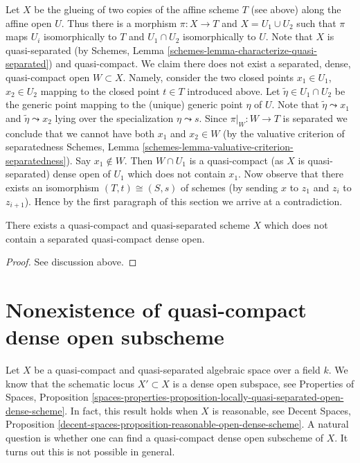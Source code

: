 \noindent
Let $X$ be the glueing of two copies of the affine scheme $T$ (see above)
along the affine open $U$. Thus there is a morphism $\pi : X \to T$ and
$X = U_1 \cup U_2$ such that $\pi$ maps $U_i$ isomorphically to $T$ and
$U_1 \cap U_2$ isomorphically to $U$. Note that $X$ is quasi-separated
(by Schemes, Lemma \ref{schemes-lemma-characterize-quasi-separated})
and quasi-compact. We claim there does not exist a separated, dense,
quasi-compact open $W \subset X$. Namely, consider the two closed
points $x_1 \in U_1$, $x_2 \in U_2$ mapping to the closed point $t \in T$
introduced above. Let $\tilde \eta \in U_1 \cap U_2$ be the generic point
mapping to the (unique) generic point $\eta$ of $U$.
Note that $\tilde\eta \leadsto x_1$ and $\tilde\eta \leadsto x_2$
lying over the specialization $\eta \leadsto s$.
Since $\pi|_W : W \to T$ is separated we conclude that we cannot have both
$x_1$ and $x_2 \in W$ (by the valuative criterion of separatedness
Schemes, Lemma \ref{schemes-lemma-valuative-criterion-separatedness}).
Say $x_1 \not \in W$. Then $W \cap U_1$ is a quasi-compact (as $X$
is quasi-separated) dense open of $U_1$ which does not contain $x_1$.
Now observe that there exists an isomorphism $(T, t) \cong (S, s)$
of schemes (by sending $x$ to $z_1$ and $z_i$ to $z_{i + 1}$).
Hence by the first paragraph of this section we arrive at a contradiction.

\begin{lemma}
\label{lemma-no-dense-separated-quasi-compact-open-in-qcqs}
There exists a quasi-compact and quasi-separated scheme $X$ which does
not contain a separated quasi-compact dense open.
\end{lemma}

\begin{proof}
See discussion above.
\end{proof}







\section{Nonexistence of quasi-compact dense open subscheme}
\label{section-nonexistence-qc-dense-open-subscheme}

\noindent
Let $X$ be a quasi-compact and quasi-separated algebraic space over a field
$k$. We know that the schematic locus $X' \subset X$ is a dense open
subspace, see
Properties of Spaces, Proposition
\ref{spaces-properties-proposition-locally-quasi-separated-open-dense-scheme}.
In fact, this result holds when $X$ is reasonable, see
Decent Spaces, Proposition
\ref{decent-spaces-proposition-reasonable-open-dense-scheme}.
A natural question is whether one can find a quasi-compact dense
open subscheme of $X$. It turns out this is not possible in general.

